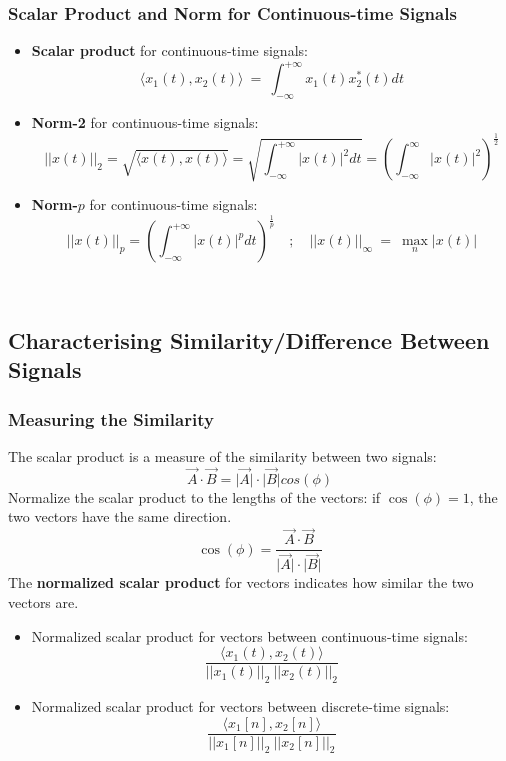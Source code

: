 \subsubsection{Scalar Product and Norm for Continuous-time Signals}
\begin{itemize}
 \item \textbf{Scalar product} for continuous-time signals:
  \[ \langle x_{1}(t), x_{2}(t) \rangle \ = \ \int_{-\infty}^{+\infty}  x_{1}(t) x_{2}^{*}(t) dt \]
 \item \textbf{Norm-2} for continuous-time signals:
  \[  \lvert \lvert x(t) \rvert \rvert_{2} = \sqrt{\langle x(t), x(t) \rangle} = \sqrt{\int_{-\infty}^{+\infty}\lvert
   x(t) \rvert^{2} dt} = \left( \int_{-\infty}^{\infty} \lvert x(t) \rvert^{2} \right) ^{\frac{1}{2}} \]
  \item \textbf{Norm-$p$} for continuous-time signals:
   \[ \lvert \lvert x(t) \rvert \rvert_{p} =\left( \int_{-\infty}^{+\infty} \lvert x(t) \rvert^{p} dt \right)^{\frac{1}{p}}
   \quad ; \quad \lvert \lvert x(t) \rvert \rvert_{\infty} \ = \ \max_{n}  \lvert x(t) \rvert \]
\end{itemize}
 
\ \\
\subsection{Characterising Similarity/Difference Between Signals}
\subsubsection{Measuring the Similarity}
 The scalar product is a measure of the similarity between two signals:
 \[ \vec{A} \cdot \vec{B} =\lvert \vec{A} \rvert \cdot \lvert \vec{B} \rvert cos(\phi) \]
 Normalize the scalar product to the lengths of the vectors: if $\cos(\phi)=1$, the two vectors have the same direction.
\[ \cos(\phi) = \frac{\vec{A} \cdot \vec{B}}{\lvert \vec{A} \rvert \cdot \lvert \vec{B} \rvert} \]
The \textbf{normalized scalar product} for vectors indicates how similar the two vectors are.
\begin{itemize}
 \item Normalized scalar product for vectors between continuous-time signals: 
 \[ \frac{\langle x_{1}(t), x_{2}(t) \rangle}{ \lvert \lvert x_{1}(t) \rvert \rvert_{2} \ \lvert \lvert x_{2}(t) \rvert \rvert_{2}} \]
 \item Normalized scalar product for vectors between discrete-time signals: 
 \[ \frac{\langle x_{1}[n], x_{2}[n] \rangle}{ \lvert \lvert x_{1}[n] \rvert \rvert_{2} \ \lvert \lvert x_{2}[n] \rvert \rvert_{2}} \]
 \end{itemize}
 

